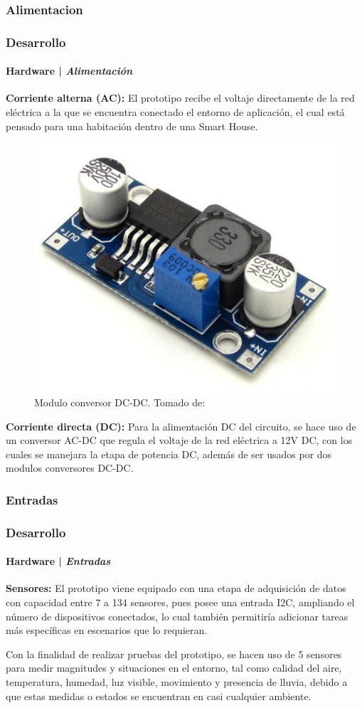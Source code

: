 \subsubsection{Alimentacion}
\begin{frame}
\frametitle{Desarrollo}
\framesubtitle{Hardware | \emph{Alimentación}}
	\textbf{Corriente alterna (AC):}
		El prototipo recibe el voltaje directamente de la red eléctrica a la que se encuentra conectado el entorno de aplicación, el cual está pensado para una habitación dentro de una Smart House.\newline
		
		\begin{figure}
			\centering
			\caption{Modulo conversor DC-DC. Tomado de: \cite{DCDC}}
			\label{fig:DCDC}
			\includegraphics[width=0.5\linewidth]{Imagenes/DCDC}
		\end{figure}
	\textbf{Corriente directa (DC):}
		Para la alimentación DC del circuito, se hace uso de un conversor AC-DC que regula el voltaje de la red eléctrica a 12V DC, con los cuales se manejara la etapa de potencia DC, además de ser usados por dos modulos conversores DC-DC.\\

\end{frame}
	
\subsubsection{Entradas}

\begin{frame}[t]
\frametitle{Desarrollo}
\framesubtitle{Hardware | \emph{Entradas}}	

\textbf{Sensores:}
		El prototipo viene equipado con una etapa de adquisición de datos con capacidad entre 7 a 134 sensores, pues posee una entrada I2C, ampliando el número de dispositivos conectados, lo cual también permitiría adicionar tareas más específicas en escenarios que lo requieran.\newline
		
		Con la finalidad de realizar pruebas del prototipo, se hacen uso de 5 sensores para medir magnitudes y situaciones en el entorno, tal como calidad del aire, temperatura, humedad, luz visible, movimiento y presencia de lluvia, debido a que estas medidas o estados se encuentran en casi cualquier ambiente. 
\end{frame}

